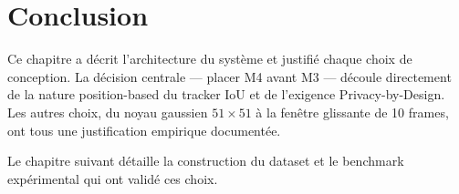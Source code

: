 \section*{Conclusion}

Ce chapitre a décrit l'architecture du
système et justifié chaque choix de
conception. La décision centrale —
placer M4 avant M3 — découle directement
de la nature position-based du tracker
IoU et de l'exigence Privacy-by-Design.
Les autres choix, du noyau gaussien
$51 \times 51$ à la fenêtre glissante
de 10 frames, ont tous une justification
empirique documentée.

Le chapitre suivant détaille la construction
du dataset et le benchmark expérimental
qui ont validé ces choix.